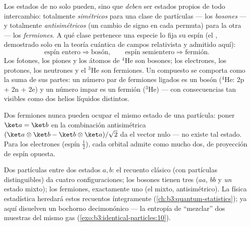 \begin{theorem}\label{thm:b3:identical-particles:postulate}
Los estados de  no solo pueden, sino que \emph{deben}
ser estados propios de todo intercambio: totalmente \emph{simétricos} para
una clase de partículas --- los \emph{bosones} --- y totalmente
\emph{antisimétricos} (un cambio de signo en cada permuta)
para la otra --- los \emph{fermiones}. A qué clase pertenece una especie lo
fija su espín (el \emph{}, demostrado solo en la
teoría cuántica de campos relativista y admitido aquí):
\[
\text{espín entero} \Rightarrow \text{bosón} , \qquad
\text{espín semientero} \Rightarrow \text{fermión} .
\]
Los fotones, los piones y los átomos de $^4$He son bosones; los electrones,
los protones, los neutrones y el $^3$He son fermiones.
Un compuesto se comporta como la suma de sus partes: un número par de
fermiones ligados es un bosón ($^4$He: 2p + 2n + 2e) y un número
impar es un fermión ($^3$He) --- con consecuencias tan visibles como dos
helios líquidos distintos.
\end{theorem}
\admitted

\begin{corollary}\label{cor:b3:identical-particles:pauli}
Dos fermiones nunca pueden ocupar el mismo estado de una partícula: poner
$\ket a = \ket b$ en la combinación antisimétrica
$(\ket a\otimes\ket b - \ket b\otimes\ket a)/\sqrt2$ da el vector
nulo --- no existe tal estado. Para los electrones (espín $\tfrac12$),
cada orbital admite como mucho dos, de proyección de espín opuesta.
\end{corollary}

\begin{example}\label{ex:b3:identical-particles:counting}
Dos partículas entre dos estados $a, b$: el recuento clásico (con
partículas distinguibles) da cuatro configuraciones; los bosones tienen tres
($aa$, $bb$ y \emph{un} estado mixto); los fermiones, exactamente uno (el
mixto, antisimétrico). La física estadística heredará estos recuentos
íntegramente (\cref{ch:b3:quantum-statistics}); ya aquí disuelven un
bochorno decimonónico --- la entropía de ``mezclar'' dos muestras del mismo
gas (\cref{exo:b3:identical-particles:10}).
\end{example}

